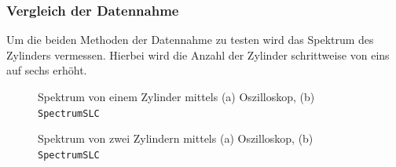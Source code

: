 \subsubsection{Vergleich der Datennahme}
Um die beiden Methoden der Datennahme zu testen wird das Spektrum des Zylinders vermessen.
Hierbei wird die Anzahl der Zylinder schrittweise von eins auf sechs erhöht.
\FloatBarrier
\begin{figure}
    \caption{Spektrum von einem Zylinder mittels (a) Oszilloskop, (b) \texttt{SpectrumSLC}}
\end{figure}
\begin{figure}
    \caption{Spektrum von zwei Zylindern mittels (a) Oszilloskop, (b) \texttt{SpectrumSLC}}
\end{figure}
